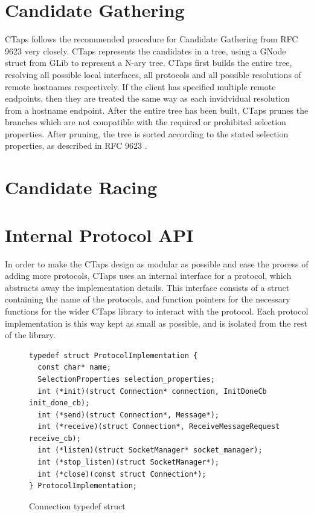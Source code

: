 \section{Candidate Gathering}
CTaps follows the recommended procedure for Candidate Gathering from RFC 9623
very closely. CTaps represents the candidates in a tree, using a GNode struct from
GLib to represent a N-ary tree. CTaps first builds the entire tree, resolving
all possible local interfaces, all protocols and all possible resolutions of
remote hostnames respectively. If the client has specified multiple remote endpoints,
then they are treated the same way as each invidvidual resolution from a hostname
endpoint. After the entire tree has been built, CTaps prunes the branches which
are not compatible with the required or prohibited selection properties. After pruning,
the tree is sorted according to the stated selection properties, as described in RFC 9623 
\cite{brunstromImplementingInterfacesTransport2025}.

\section{Candidate Racing}

\section{Internal Protocol API} 
In order to make the CTaps design as modular as possible and ease the
process of adding more protocols, CTaps uses an internal interface for a protocol,
which abstracts away the implementation details. This interface consists of
a struct containing the name of the protocols, and function pointers for
the necessary functions for the wider CTaps library to interact with the protocol.
Each protocol implementation is this way kept as small as possible, and is
isolated from the rest of the library.
 
\begin{figure}[H]
\begin{verbatim}
typedef struct ProtocolImplementation {
  const char* name;
  SelectionProperties selection_properties;
  int (*init)(struct Connection* connection, InitDoneCb init_done_cb);
  int (*send)(struct Connection*, Message*);
  int (*receive)(struct Connection*, ReceiveMessageRequest receive_cb);
  int (*listen)(struct SocketManager* socket_manager);
  int (*stop_listen)(struct SocketManager*);
  int (*close)(const struct Connection*);
} ProtocolImplementation;
\end{verbatim}
\caption{Connection typedef struct}
\end{figure} 

